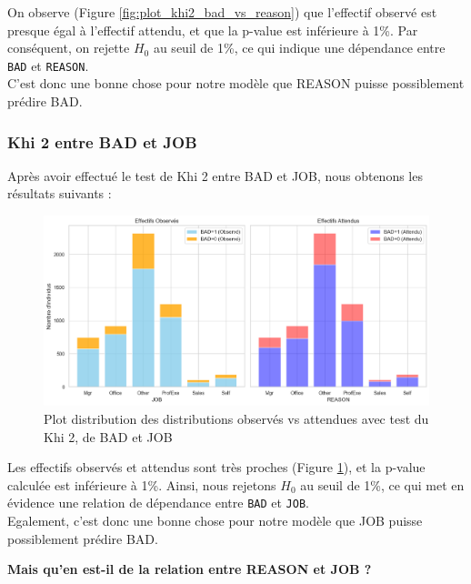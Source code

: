 \documentclass[a4paper,12pt]{report}
\begin{document}
On observe (Figure \ref{fig:plot_khi2_bad_vs_reason}) que l'effectif observé est presque égal à l'effectif attendu, et que la p-value est inférieure à 1\%. Par conséquent, on rejette $H_0$ au seuil de 1\%, ce qui indique une dépendance entre \texttt{BAD} et \texttt{REASON}.\\
C'est donc une bonne chose pour notre modèle que REASON puisse possiblement prédire BAD.

\subsubsection{Khi 2 entre {\color{teal} BAD} et {\color{teal} JOB}}

Après avoir effectué le test de Khi 2 entre {\color{teal} BAD} et {\color{teal} JOB}, nous obtenons les résultats suivants :\\

\begin{figure}[h!]
  \includegraphics[width=\textwidth]{../images/plot_khi2_bad_vs_job}
  \caption{Plot distribution des distributions observés vs attendues avec test du Khi 2, de BAD et JOB}
  \label{fig:plot_khi2_bad_vs_job}
\end{figure}

\pagebreak

Les effectifs observés et attendus sont très proches (Figure \ref{fig:plot_khi2_bad_vs_job}), et la p-value calculée est inférieure à 1\%. Ainsi, nous rejetons $H_0$ au seuil de 1\%, ce qui met en évidence une relation de dépendance entre \texttt{BAD} et \texttt{JOB}.\\
Egalement, c'est donc une bonne chose pour notre modèle que JOB puisse possiblement prédire BAD.

\bigbreak

\textbf{Mais qu'en est-il de la relation entre REASON et JOB ?}\\
\end{document}
